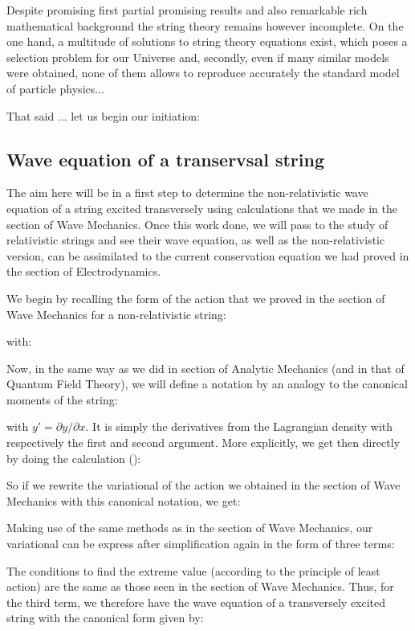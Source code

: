 	Despite promising first partial promising results and also remarkable rich mathematical background the string theory remains however incomplete. On the one hand, a multitude of solutions to string theory equations exist, which poses a selection problem for our Universe and, secondly, even if many similar models were obtained, none of them allows to reproduce accurately the standard model of particle physics...
	
	That said ... let us begin our initiation:
	
	\subsection{Wave equation of a transervsal string}
	The aim here will be in a first step to determine the non-relativistic wave equation of a string excited transversely using calculations that we made in the section of Wave Mechanics. Once this work done, we will pass to the study of relativistic strings and see their wave equation, as well as the non-relativistic version, can be assimilated to the current conservation equation we had proved in the section of Electrodynamics.
	
	We begin by recalling the form of the action that we proved in the section of Wave Mechanics for a non-relativistic string:
	
	with:
	
	Now, in the same way as we did in section of Analytic Mechanics (and in that of Quantum Field Theory), we will define a notation by an analogy to the canonical moments of the string:
	
	with $y'=\partial y/\partial x$. It is simply the derivatives from the Lagrangian density with respectively the first and second argument. More explicitly, we get then directly by doing the calculation ():
	
	So if we rewrite the variational of the action we obtained in the section of Wave Mechanics with this canonical notation, we get:
	
	Making use of the same methods as in the section of Wave Mechanics, our variational can be express after simplification again in the form of three terms:
	
	The conditions to find the extreme value (according to the principle of least action) are the same as those seen in the section of Wave Mechanics. Thus, for the third term, we therefore have the wave equation of a transversely excited string with the canonical form given by:
	
